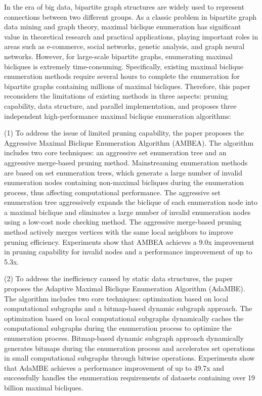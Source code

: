 In the era of big data, bipartite graph structures are widely used to represent connections between two different groups. As a classic problem in bipartite graph data mining and graph theory, maximal biclique enumeration has significant value in theoretical research and practical applications, playing important roles in areas such as e-commerce, social networks, genetic analysis, and graph neural networks. However, for large-scale bipartite graphs, enumerating maximal bicliques is extremely time-consuming. Specifically, existing maximal biclique enumeration methods require several hours to complete the enumeration for bipartite graphs containing millions of maximal bicliques. Therefore, this paper reconsiders the limitations of existing methods in three aspects: pruning capability, data structure, and parallel implementation, and proposes three independent high-performance maximal biclique enumeration algorithms:

(1) To address the issue of limited pruning capability, the paper proposes the Aggressive Maximal Biclique Enumeration Algorithm (AMBEA). The algorithm includes two core techniques: an aggressive set enumeration tree and an aggressive merge-based pruning method. Mainstreaming enumeration methods are based on set enumeration trees, which generate a large number of invalid enumeration nodes containing non-maximal bicliques during the enumeration process, thus affecting computational performance. The aggressive set enumeration tree aggressively expands the biclique of each enumeration node into a maximal biclique and eliminates a large number of invalid enumeration nodes using a low-cost node checking method. The aggressive merge-based pruning method actively merges vertices with the same local neighbors to improve pruning efficiency. Experiments show that AMBEA achieves a 9.0x improvement in pruning capability for invalid nodes and a performance improvement of up to 5.3x.

(2) To address the inefficiency caused by static data structures, the paper proposes the Adaptive Maximal Biclique Enumeration Algorithm (AdaMBE). The algorithm includes two core techniques: optimization based on local computational subgraphs and a bitmap-based dynamic subgraph approach. The optimization based on local computational subgraphs dynamically caches the computational subgraphs during the enumeration process to optimize the enumeration process. Bitmap-based dynamic subgraph approach dynamically generates bitmaps during the enumeration process and accelerates set operations in small computational subgraphs through bitwise operations. Experiments show that AdaMBE achieves a performance improvement of up to 49.7x and successfully handles the enumeration requirements of datasets containing over 19 billion maximal bicliques.

